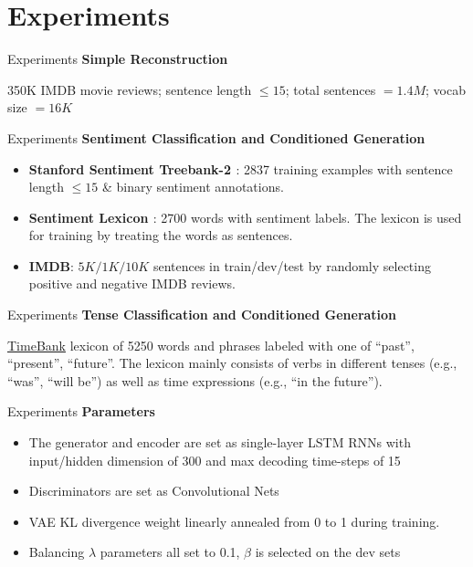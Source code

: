 \documentclass{beamer}
\begin{document}
\section{Experiments}
\begin{frame}{Experiments}
  \textbf{Simple Reconstruction}

  350K IMDB movie reviews; sentence length $\leq 15$; total sentences $= 1.4M$; vocab size $= 16K$
\end{frame}

\begin{frame}{Experiments}
  \textbf{Sentiment Classification and Conditioned Generation}

  \begin{itemize}
    \item \textbf{Stanford Sentiment Treebank-2 \cite{socher2013recursive}}: 2837 training examples with sentence length $\leq 15$ \& binary sentiment annotations.
    \item \textbf{Sentiment Lexicon \cite{wilson2005recognizing}}:  2700 words with sentiment labels. The lexicon is used for training by treating the words as sentences.
    \item \textbf{IMDB}: $5K/1K/10K$ sentences in train/dev/test by randomly selecting positive and negative IMDB reviews.
  \end{itemize}
  
\end{frame}

\begin{frame}{Experiments}
  \textbf{Tense Classification and Conditioned Generation}

  \href{http://timeml.org}{TimeBank} lexicon of 5250 words and phrases labeled with one of {“past”, “present”, “future”}. The lexicon mainly consists of verbs in different tenses (e.g., “was”, “will be”) as well as time expressions (e.g., “in the future”).
\end{frame}

\begin{frame}{Experiments}
  \textbf{Parameters}
  \begin{itemize}
    \item The generator and encoder are set as single-layer LSTM RNNs with input/hidden dimension of 300 and max decoding time-steps of 15
    \item Discriminators are set as Convolutional Nets
    \item VAE KL divergence weight linearly annealed from 0 to 1 during training.
    \item Balancing $\lambda$ parameters all set to 0.1, $\beta$ is selected on the dev sets
  \end{itemize}
\end{frame}
\end{document}
